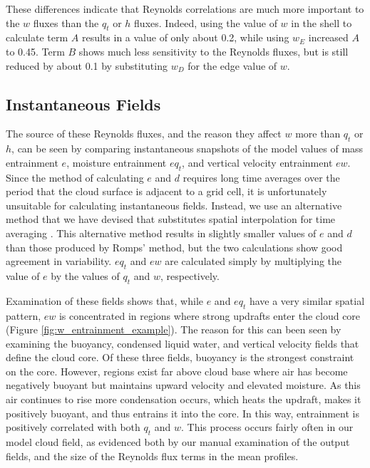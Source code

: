 \documentclass[12pt]{article}
\begin{document}
These differences indicate that Reynolds correlations are much more important 
to the $w$ fluxes than the $q_t$ or $h$ fluxes.  Indeed, using the value 
of $w$ in the shell to calculate term $A$ results in a value of only about 0.2, 
while using $w_E$ increased $A$ to 0.45.  Term $B$ shows much less sensitivity 
to the Reynolds fluxes, but is still reduced by about 0.1 by substituting $w_D$ 
for the edge value of $w$.


\subsection{Instantaneous Fields}

The source of these Reynolds fluxes, and the reason they affect $w$ more than 
$q_t$ or $h$, can be seen by comparing instantaneous snapshots of the model 
values of mass entrainment $e$, moisture entrainment $e{q_t}$, and vertical 
velocity entrainment $e{w}$.  Since the \cite{Romps2010} method of calculating 
$e$ and $d$ requires long time averages over the period that the cloud surface
is adjacent to a grid cell, it is unfortunately unsuitable for calculating 
instantaneous fields.  Instead, we use an alternative method that we have devised 
that substitutes spatial interpolation for time averaging \citep{Dawe2011}.  
This alternative method results in slightly smaller values of $e$ and $d$ than 
those produced by Romps' method, but the two calculations show good agreement in 
variability. $eq_t$ and $ew$ are calculated simply by multiplying the value 
of $e$ by the values of $q_t$ and $w$, respectively.

Examination of these fields shows that, while $e$ and $eq_t$ have a very 
similar spatial pattern, $ew$ is concentrated in regions where strong updrafts 
enter the cloud core (Figure \ref{fig:w_entrainment_example}).  The reason for 
this can been seen by examining the buoyancy, condensed liquid water,
and vertical velocity fields that define the cloud core.  Of these three
fields, buoyancy is the strongest constraint on the core.  However, regions 
exist far above cloud base where air has become negatively buoyant but 
maintains upward velocity and elevated moisture.  As this air continues to 
rise more condensation occurs, which heats the updraft, makes it positively 
buoyant, and thus entrains it into the core.  In this way, entrainment is 
positively correlated with both $q_t$ and $w$.  This process occurs fairly 
often in our model cloud field, as evidenced both by our manual examination of 
the output fields, and the size of the Reynolds flux terms in the mean 
profiles.
\end{document}
